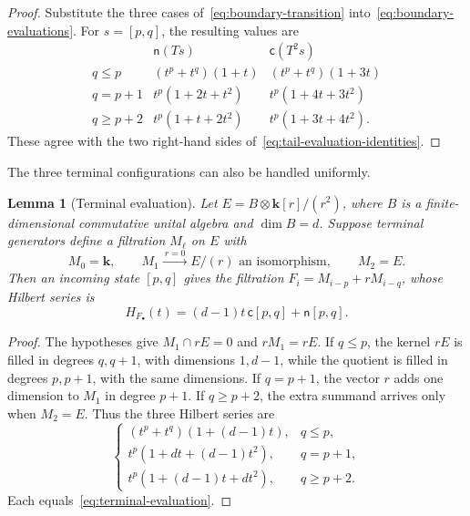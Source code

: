 \documentclass[reqno]{article}
\theoremstyle{plain} %
\newtheorem{lemma}[theorem]{Lemma}
\theoremstyle{definition}
\theoremstyle{remark}
\newcommand{\K} {\mathbf{k}}
\numberwithin{equation}{section}
\begin{document}
\begin{proof}
Substitute the three cases of~\eqref{eq:boundary-transition}
into~\eqref{eq:boundary-evaluations}. For \(s=[p,q]\), the resulting
values are
\[
\begin{array}{c|c|c}
 &\mathsf n(Ts)&\mathsf c(T^2s)\\ \hline
q\le p &(t^p+t^q)(1+t)&(t^p+t^q)(1+3t)\\
q=p+1 &t^p(1+2t+t^2)&t^p(1+4t+3t^2)\\
q\ge p+2 &t^p(1+t+2t^2)&t^p(1+3t+4t^2).
\end{array}
\]
These agree with the two right-hand sides
of~\eqref{eq:tail-evaluation-identities}.
\end{proof}

The three terminal configurations can also be handled uniformly.

\begin{lemma}[Terminal evaluation]
\label{lem:terminal-evaluation}
Let \(E=B\otimes\K[r]/(r^2)\), where \(B\) is a finite-dimensional
commutative unital algebra and \(\dim B=d\). Suppose terminal generators
define a filtration \(M_\ell\) on \(E\) with
\begin{equation}
\label{eq:terminal-complement}
M_0=\K,\qquad M_1\xrightarrow{\ r=0\ }E/(r)
\text{ an isomorphism},\qquad M_2=E.
\end{equation}
Then an incoming state \([p,q]\) gives the filtration
\(F_i=M_{i-p}+rM_{i-q}\), whose Hilbert series is
\begin{equation}
\label{eq:terminal-evaluation}
H_{F_\bullet}(t)=(d-1)t\,\mathsf c[p,q]+\mathsf n[p,q].
\end{equation}
\end{lemma}

\begin{proof}
The hypotheses give \(M_1\cap rE=0\) and \(rM_1=rE\). If
\(q\le p\), the kernel \(rE\) is filled in degrees \(q,q+1\),
with dimensions \(1,d-1\), while the quotient is filled in degrees
\(p,p+1\), with the same dimensions. If \(q=p+1\), the vector
\(r\) adds one dimension to \(M_1\) in degree \(p+1\). If
\(q\ge p+2\), the extra summand arrives only when \(M_2=E\).
Thus the three Hilbert series are
\[
\begin{cases}
(t^p+t^q)(1+(d-1)t),&q\le p,\\
t^p(1+dt+(d-1)t^2),&q=p+1,\\
t^p(1+(d-1)t+dt^2),&q\ge p+2.
\end{cases}
\]
Each equals~\eqref{eq:terminal-evaluation}.
\end{proof}
\end{document}

